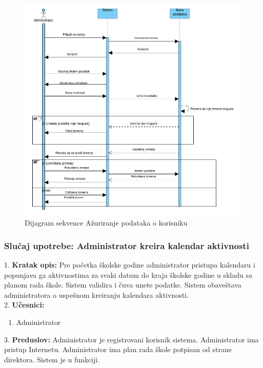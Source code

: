 \documentclass{article}
\begin{document}
\begin{figure} [!ht]
    \begin{center}
        \includegraphics[scale=0.4]{imgs/Dijagram_sekvence_administrator_azurira_podatke.png}
    \end{center}
\caption{Dijagram sekvence Ažuriranje podataka o korisniku}
\end{figure}


\newpage
\subsubsection{Slučaj upotrebe: Administrator kreira kalendar aktivnosti}
1. \textbf{Kratak opis:} Pre početka školske godine administrator pristupa kalendaru i popunjava ga aktivnostima za svaki datum do kraja školske godine u skladu sa planom rada škole. Sistem validira i čuva unete podatke. Sistem obaveštava administratora o uspešnom kreiranju kalendara aktivnosti. \\ 

2. \textbf{Učesnici:}
\begin{enumerate} [label=(\alph*)]
\item Administrator
\end{enumerate} 

3. \textbf{Preduslov:} Administrator je registrovani korisnik sistema. Administrator ima pristup Internetu. Administrator ima plan rada škole potpisan od strane direktora. Sistem je u funkciji. \\
\end{document}
